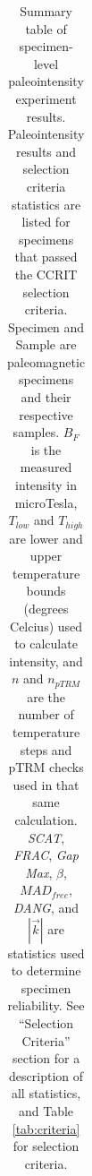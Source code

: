 \documentclass[draft]{agujournal2019}
\begin{document}
\begin{landscape}
\footnotesize
{}\textwidth
\begin{longtable}{llcccccccccccc}
\caption{Summary table of specimen-level paleointensity experiment results. Paleointensity results and selection criteria statistics are listed for specimens that passed the CCRIT selection criteria. Specimen and Sample are paleomagnetic specimens and their respective samples. $B_{F}$ is the measured intensity in microTesla, $T_{low}$ and $T_{high}$ are lower and upper temperature bounds (degrees Celcius) used to calculate intensity, and $n$ and $n_{pTRM}$ are the number of temperature steps and pTRM checks used in that same calculation. \textit{SCAT}, \textit{FRAC}, \textit{Gap Max}, $\beta$, $MAD_{free}$, \textit{DANG}, and $|\vec{k}|$ are statistics used to determine specimen reliability. See “Selection Criteria” section for a description of all statistics, and Table \ref{tab:criteria} for selection criteria.}\\


\end{longtable}
\end{landscape}
\end{document}
